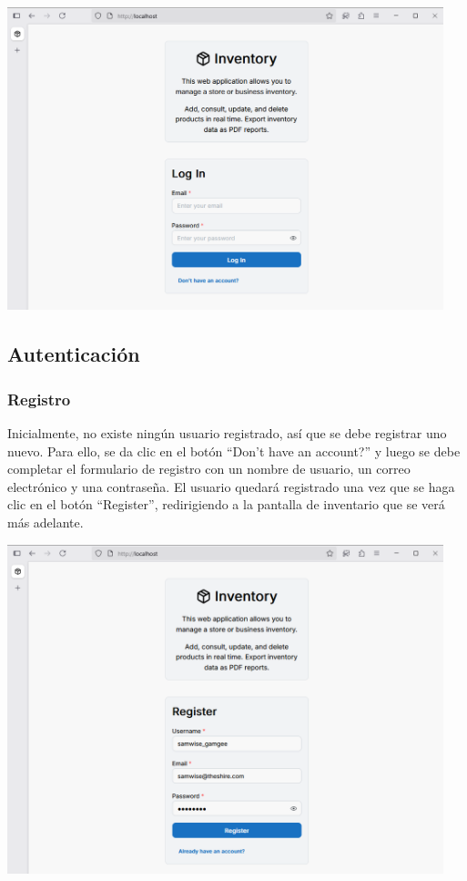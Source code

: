 \begin{center}
\includegraphics[width=0.95\textwidth]{images/1 Pantalla Inicial}
\end{center}

\subsection{Autenticación}

\subsubsection{Registro}

Inicialmente, no existe ningún usuario registrado, así que se debe registrar uno nuevo. Para ello, se da clic en el botón “Don't have an account?” y luego se debe completar el formulario de registro con un nombre de usuario, un correo electrónico y una contraseña. El usuario quedará registrado una vez que se haga clic en el botón “Register”, redirigiendo a la pantalla de inventario que se verá más adelante.

\begin{center}
\includegraphics[width=0.95\textwidth]{images/2 Registro}
\end{center}

